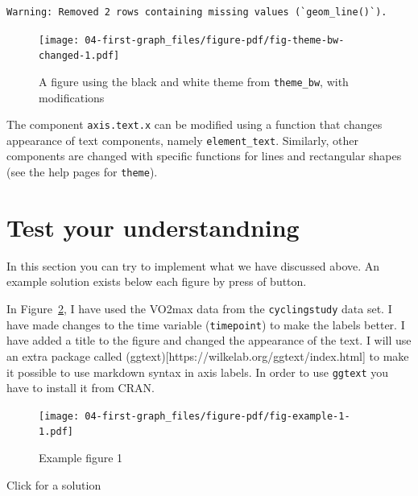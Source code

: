 \documentclass[
  11pt,
  letterpaper,
]{scrbook}
\begin{document}
\begin{verbatim}
Warning: Removed 2 rows containing missing values (`geom_line()`).
\end{verbatim}

\begin{figure}[H]

{\centering \texttt{[image: 04-first-graph\_files/figure-pdf/fig-theme-bw-changed-1.pdf]}

}

\caption{\label{fig-theme-bw-changed}A figure using the black and white
theme from \texttt{theme\_bw}, with modifications}

\end{figure}

The component \texttt{axis.text.x} can be modified using a function that
changes appearance of text components, namely \texttt{element\_text}.
Similarly, other components are changed with specific functions for
lines and rectangular shapes (see the help pages for \texttt{theme}).

\hypertarget{test-your-understandning}{%
\section{Test your understandning}\label{test-your-understandning}}

In this section you can try to implement what we have discussed above.
An example solution exists below each figure by press of button.

In Figure~\ref{fig-example-1}, I have used the VO2max data from the
\texttt{cyclingstudy} data set. I have made changes to the time variable
(\texttt{timepoint}) to make the labels better. I have added a title to
the figure and changed the appearance of the text. I will use an extra
package called (ggtext){[}https://wilkelab.org/ggtext/index.html{]} to
make it possible to use markdown syntax in axis labels. In order to use
\texttt{ggtext} you have to install it from CRAN.

\begin{figure}

{\centering \texttt{[image: 04-first-graph\_files/figure-pdf/fig-example-1-1.pdf]}

}

\caption{\label{fig-example-1}Example figure 1}

\end{figure}

Click for a solution
\end{document}
